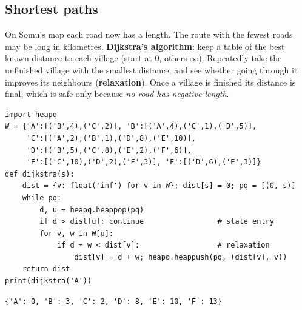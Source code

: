 \documentclass[11pt,a4paper]{article}
\begin{document}
\subsection{Shortest paths}
\begin{center}
\end{center}
\begin{story}
On Somu's map each road now has a length. The route with the fewest roads may be long in kilometres. \textbf{Dijkstra's algorithm}: keep a table of the best known distance to each village (start at $0$, others $\infty$). Repeatedly take the unfinished village with the smallest distance, and see whether going through it improves its neighbours (\textbf{relaxation}). Once a village is finished its distance is final, which is safe only because \emph{no road has negative length}.
\end{story}
\begin{lstlisting}
import heapq
W = {'A':[('B',4),('C',2)], 'B':[('A',4),('C',1),('D',5)],
     'C':[('A',2),('B',1),('D',8),('E',10)],
     'D':[('B',5),('C',8),('E',2),('F',6)],
     'E':[('C',10),('D',2),('F',3)], 'F':[('D',6),('E',3)]}
def dijkstra(s):
    dist = {v: float('inf') for v in W}; dist[s] = 0; pq = [(0, s)]
    while pq:
        d, u = heapq.heappop(pq)
        if d > dist[u]: continue                 # stale entry
        for v, w in W[u]:
            if d + w < dist[v]:                  # relaxation
                dist[v] = d + w; heapq.heappush(pq, (dist[v], v))
    return dist
print(dijkstra('A'))
\end{lstlisting}
\begin{lstlisting}[style=out]
{'A': 0, 'B': 3, 'C': 2, 'D': 8, 'E': 10, 'F': 13}
\end{lstlisting}
\end{document}
